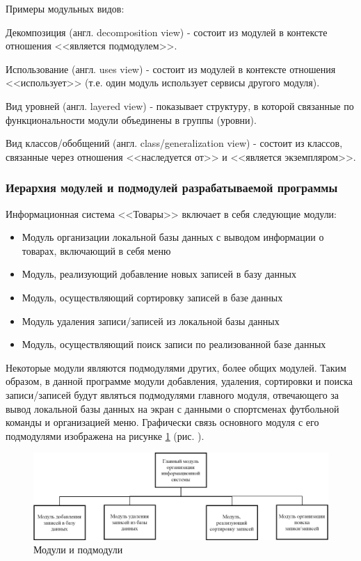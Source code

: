 Примеры модульных видов:

Декомпозиция (англ. decomposition view) - состоит из модулей в контексте отношения <<является подмодулем>>.

Использование (англ. uses view) - состоит из модулей в контексте отношения <<использует>> (т.е. один модуль использует сервисы другого модуля).

Вид уровней (англ. layered view) - показывает структуру, в которой связанные по функциональности модули объединены в группы (уровни).

Вид классов/обобщений (англ. class/generalization view) - состоит из классов, связанные через отношения <<наследуется от>> и <<является экземпляром>>.

\subsubsection{Иерархия модулей и подмодулей разрабатываемой программы}

Информационная система <<Товары>> включает в себя следующие модули:

\begin{itemize}
    \item Модуль организации локальной базы данных с выводом информации о товарах, включающий в себя меню
    \item Модуль, реализующий добавление новых записей в базу данных
    \item Модуль, осуществляющий сортировку записей в базе данных
    \item Модуль удаления записи/записей из локальной базы данных
    \item Модуль, осуществляющий поиск записи по реализованной базе данных
\end{itemize}

Некоторые модули являются подмодулями других, более общих модулей. Таким образом, в данной программе модули добавления, удаления, сортировки и поиска записи/записей будут являться подмодулями главного модуля, отвечающего за вывод локальной базы данных на экран с данными о спортсменах футбольной команды и организацией меню. Графически связь основного модуля с его подмодулями изображена на рисунке \ref{fig:modules} (рис. \pageref{fig:modules}).

\begin{figure}[!hp]
    \begin{center}
        \includegraphics[]{../_input/modules.png}
    \end{center}
    \caption{Модули и подмодули\label{fig:modules}}
\end{figure}

\newpage